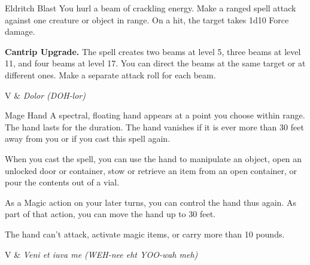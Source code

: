 

\pagestyle{empty}


\begin{Spell}[
  level=Cantrip,
  time=1 Action,
  range=120 ft,
  components={V, S},
  duration=Instantaneous,
  school=Evocation,
  attack=Ranged,
  effect=Force
]{Eldritch Blast}
You hurl a beam of crackling energy. Make a ranged spell attack against one creature or object in range. On a hit, the target takes 1d10 Force damage.

\textbf{Cantrip Upgrade.} The spell creates two beams at level 5, three beams at level 11, and four beams at level 17. You can direct the beams at the same target or at different ones. Make a separate attack roll for each beam.

\begin{components}
V & \textit{Dolor (DOH-lor)}
\end{components}
\end{Spell}


\begin{Spell}[
  level=Cantrip,
  time=1 Action,
  range=30 ft,
  components={V, S},
  duration=1 Minute,
  school=Conjuration,
  attack=None,
  effect=Utility
]{Mage Hand}
A spectral, floating hand appears at a point you choose within range. The hand lasts for the duration. The hand vanishes if it is ever more than 30 feet away from you or if you cast this spell again.

When you cast the spell, you can use the hand to manipulate an object, open an unlocked door or container, stow or retrieve an item from an open container, or pour the contents out of a vial.

As a Magic action on your later turns, you can control the hand thus again. As part of that action, you can move the hand up to 30 feet.

The hand can't attack, activate magic items, or carry more than 10 pounds.

\begin{components}
V & \textit{Veni et iuva me (WEH-nee eht YOO-wah meh)}
\end{components}
\end{Spell}


